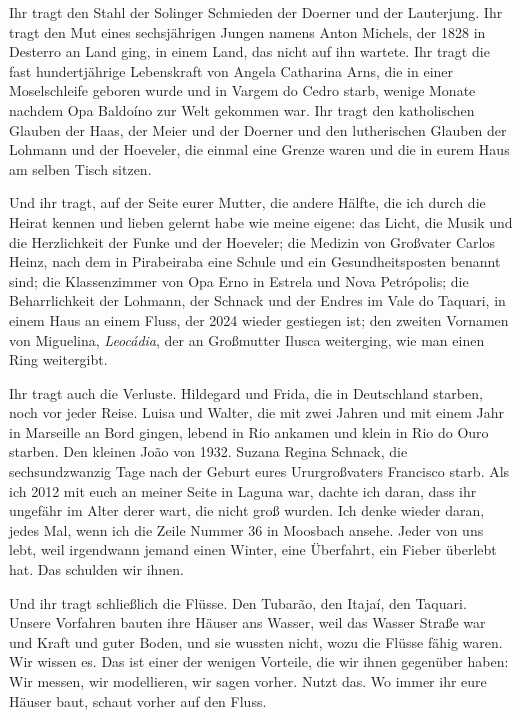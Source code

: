 \documentclass[
  ngerman,
  11pt,
  openany]{book}
\begin{document}
Ihr tragt den Stahl der Solinger Schmieden der Doerner und der
Lauterjung. Ihr tragt den Mut eines sechsjährigen Jungen namens Anton
Michels, der 1828 in Desterro an Land ging, in einem Land, das nicht auf
ihn wartete. Ihr tragt die fast hundertjährige Lebenskraft von Angela
Catharina Arns, die in einer Moselschleife geboren wurde und in Vargem
do Cedro starb, wenige Monate nachdem Opa Baldoíno zur Welt gekommen
war. Ihr tragt den katholischen Glauben der Haas, der Meier und der
Doerner und den lutherischen Glauben der Lohmann und der Hoeveler, die
einmal eine Grenze waren und die in eurem Haus am selben Tisch sitzen.

Und ihr tragt, auf der Seite eurer Mutter, die andere Hälfte, die ich
durch die Heirat kennen und lieben gelernt habe wie meine eigene: das
Licht, die Musik und die Herzlichkeit der Funke und der Hoeveler; die
Medizin von Großvater Carlos Heinz, nach dem in Pirabeiraba eine Schule
und ein Gesundheitsposten benannt sind; die Klassenzimmer von Opa Erno
in Estrela und Nova Petrópolis; die Beharrlichkeit der Lohmann, der
Schnack und der Endres im Vale do Taquari, in einem Haus an einem Fluss,
der 2024 wieder gestiegen ist; den zweiten Vornamen von Miguelina,
\emph{Leocádia}, der an Großmutter Ilusca weiterging, wie man einen Ring
weitergibt.

Ihr tragt auch die Verluste. Hildegard und Frida, die in Deutschland
starben, noch vor jeder Reise. Luisa und Walter, die mit zwei Jahren und
mit einem Jahr in Marseille an Bord gingen, lebend in Rio ankamen und
klein in Rio do Ouro starben. Den kleinen João von 1932. Suzana Regina
Schnack, die sechsundzwanzig Tage nach der Geburt eures Ururgroßvaters
Francisco starb. Als ich 2012 mit euch an meiner Seite in Laguna war,
dachte ich daran, dass ihr ungefähr im Alter derer wart, die nicht groß
wurden. Ich denke wieder daran, jedes Mal, wenn ich die Zeile Nummer 36
in Moosbach ansehe. Jeder von uns lebt, weil irgendwann jemand einen
Winter, eine Überfahrt, ein Fieber überlebt hat. Das schulden wir ihnen.

Und ihr tragt schließlich die Flüsse. Den Tubarão, den Itajaí, den
Taquari. Unsere Vorfahren bauten ihre Häuser ans Wasser, weil das Wasser
Straße war und Kraft und guter Boden, und sie wussten nicht, wozu die
Flüsse fähig waren. Wir wissen es. Das ist einer der wenigen Vorteile,
die wir ihnen gegenüber haben: Wir messen, wir modellieren, wir sagen
vorher. Nutzt das. Wo immer ihr eure Häuser baut, schaut vorher auf den
Fluss.
\end{document}

